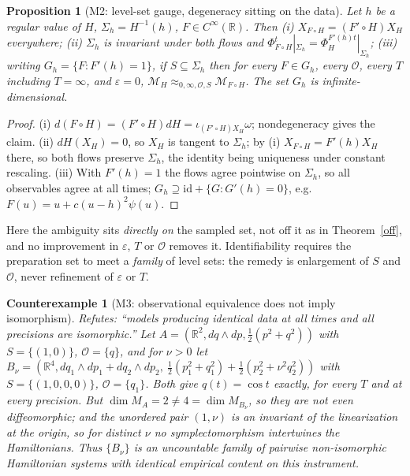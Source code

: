 \documentclass[12pt,a4paper]{article}
\theoremstyle{definition}
\theoremstyle{plain}
\newtheorem{proposition}[definition]{Proposition}
\theoremstyle{commentary}
\newtheorem{counterexample}[definition]{Counterexample}
\newcommand{\R}{\mathbb{R}}
\newcommand{\Cinf}{C^{\infty}}
\newcommand{\Oc}{\mathcal{O}}
\newcommand{\Mc}{\mathcal{M}}
\newcommand{\eps}{\varepsilon}
\begin{document}
\begin{proposition}[M2: level-set gauge, degeneracy sitting on the data]
\label{lev}
Let $h$ be a regular value of $H$, $\Sigma_h=H^{-1}(h)$, $F\in\Cinf(\R)$. Then
\emph{(i)} $X_{F\circ H}=(F'\circ H)X_H$ everywhere;
\emph{(ii)} $\Sigma_h$ is invariant under both flows and $\Phi^t_{F\circ H}|_{\Sigma_h}=\Phi^{F'(h)t}_{H}|_{\Sigma_h}$;
\emph{(iii)} writing $G_h=\{F:F'(h)=1\}$, if $S\subseteq\Sigma_h$ then for every $F\in G_h$, every $\Oc$, every $T$ including $T=\infty$, and $\eps=0$, $\Mc_H\approx_{0,\infty,\Oc,S}\Mc_{F\circ H}$. The set $G_h$ is infinite-dimensional.
\end{proposition}

\begin{proof}
(i) $d(F\circ H)=(F'\circ H)dH=\iota_{(F'\circ H)X_H}\omega$; nondegeneracy gives the claim. (ii) $dH(X_H)=0$, so $X_H$ is tangent to $\Sigma_h$; by (i) $X_{F\circ H}=F'(h)X_H$ there, so both flows preserve $\Sigma_h$, the identity being uniqueness under constant rescaling. (iii) With $F'(h)=1$ the flows agree pointwise on $\Sigma_h$, so all observables agree at all times; $G_h\supseteq\mathrm{id}+\{G:G'(h)=0\}$, e.g.\ $F(u)=u+c(u-h)^2\psi(u)$.
\end{proof}

Here the ambiguity sits \emph{directly on} the sampled set, not off it as in Theorem~\ref{off}, and no improvement in $\eps$, $T$ or $\Oc$ removes it. Identifiability requires the preparation set to meet a \emph{family} of level sets: the remedy is enlargement of $S$ and $\Oc$, never refinement of $\eps$ or $T$.

\begin{counterexample}[M3: observational equivalence does not imply isomorphism]
\label{hid}
Refutes: \emph{``models producing identical data at all times and all precisions are isomorphic.''}
Let $A=(\R^2,dq\wedge dp,\tfrac12(p^2+q^2))$ with $S=\{(1,0)\}$, $\Oc=\{q\}$, and for $\nu>0$ let
$B_\nu=(\R^4,dq_1\wedge dp_1+dq_2\wedge dp_2,\ \tfrac12(p_1^2+q_1^2)+\tfrac12(p_2^2+\nu^2q_2^2))$
with $S=\{(1,0,0,0)\}$, $\Oc=\{q_1\}$. Both give $q(t)=\cos t$ exactly, for every $T$ and at every precision. But $\dim M_A=2\neq4=\dim M_{B_\nu}$, so they are not even diffeomorphic; and the unordered pair $(1,\nu)$ is an invariant of the linearization at the origin, so for distinct $\nu$ no symplectomorphism intertwines the Hamiltonians. Thus $\{B_\nu\}$ is an uncountable family of pairwise non-isomorphic Hamiltonian systems with identical empirical content on this instrument.
\end{counterexample}
\end{document}
